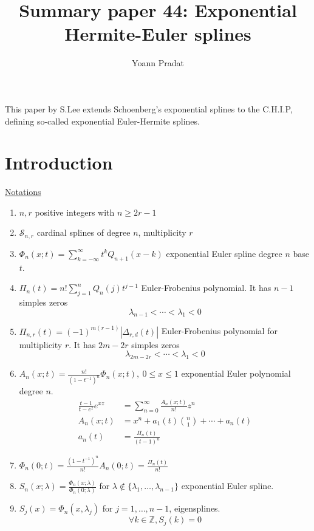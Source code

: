 \documentclass[a4paper, 11pt]{article}
\begin{document}
\title{Summary paper 44: Exponential Hermite-Euler splines}
\author{Yoann Pradat}
\maketitle

This paper by S.Lee extends Schoenberg's exponential splines to the C.H.I.P, defining so-called exponential 
Euler-Hermite splines. 

\section{Introduction}

\underline{Notations}
\begin{enumerate}
  \item $n, r$ positive integers with $n \geq 2r-1$
  \item $\mathcal{S}_{n,r}$ cardinal splines of degree $n$, multiplicity $r$
  \item $\displaystyle \Phi_n(x;t) = \sum_{k=-\infty}^{\infty} t^k Q_{n+1}(x-k)$ exponential Euler spline degree $n$ 
    base $t$.
  \item $\displaystyle \Pi_n(t) = n! \sum_{j=1}^n Q_n(j)t^{j-1}$ Euler-Frobenius polynomial. It has $n-1$ simples zeros
    \begin{equation*}
      \lambda_{n-1} < \cdots < \lambda_1 < 0
    \end{equation*}
  \item $\displaystyle \Pi_{n,r}(t) = {(-1)}^{m(r-1)}|\Delta_{r,d}(t)|$ Euler-Frobenius polynomial for multiplicity $r$.  
    It has $2m-2r$ simples zeros
    \begin{equation*}
      \lambda_{2m-2r} < \cdots < \lambda_1 < 0
    \end{equation*}
  \item $A_n(x;t) = \frac{n!}{{(1-t^{-1})}^n} \Phi_n(x;t), \ 0\leq x\leq 1$ exponential Euler polynomial degree $n$.
    \begin{align*}
      \frac{t-1}{t-e^z}e^{xz} &= \sum_{n=0}^{\infty} \frac{A_n(x;t)}{n!}z^n \\
      A_n(x;t) &= x^n + a_1(t) \binom{n}{1} + \cdots + a_n(t) \\
      a_n(t) &= \frac{\Pi_n(t)}{{(t-1)}^n} 
    \end{align*}
  \item $\Phi_n(0;t) = \frac{{(1-t^{-1})}^n}{n!} A_n(0;t) = \frac{\Pi_n(t)}{n!}$
  \item $S_n(x;\lambda) = \frac{\Phi_n(x;\lambda)}{\Phi_n(0;\lambda)}$ for $\lambda \not\in\{\lambda_1,\ldots, 
    \lambda_{n-1}\}$ exponential Euler spline.
  \item $S_j(x) = \Phi_n(x, \lambda_j)$ for $j=1, \ldots, n-1$, eigensplines. 
    \begin{equation*}
      \forall k \in \mathbb{Z}, S_j(k) = 0 
    \end{equation*}
\end{enumerate}
\end{document}
